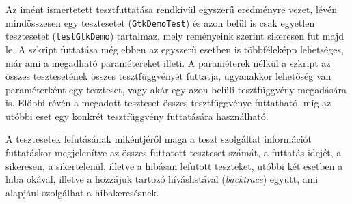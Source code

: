 Az imént ismertetett tesztfuttatása rendkívül egyszerű eredményre vezet, lévén mindösszesen egy tesztesetet (\texttt{GtkDemoTest}) és azon belül is csak egyetlen tesztesetet (\texttt{testGtkDemo}) tartalmaz, mely reményeink szerint sikeresen fut majd le. A szkript futtatása még ebben az egyszerű esetben is többféleképp lehetséges, már ami a megadható paramétereket illeti. A paraméterek nélkül a szkript az összes tesztesetének összes tesztfüggvényét futtatja, ugyanakkor lehetőség van paraméterként egy teszteset, vagy akár egy azon belüli tesztfüggvény megadására is. Előbbi révén a megadott teszteset összes tesztfüggvénye futtatható, míg az utóbbi eset egy konkrét tesztfüggvény futtatására használható.

\medskip
{}


\medskip

A tesztesetek lefutásának mikéntjéről maga a teszt szolgáltat információt futtatáskor megjelenítve az összes futtatott teszteset számát, a futtatás idejét, a sikeresen, a sikertelenül, illetve a hibásan lefutott teszteket, utóbbi két esetben a hiba okával, illetve a hozzájuk tartozó híváslistával (\textit{backtrace}) együtt, ami alapjául szolgálhat a hibakeresésnek.
